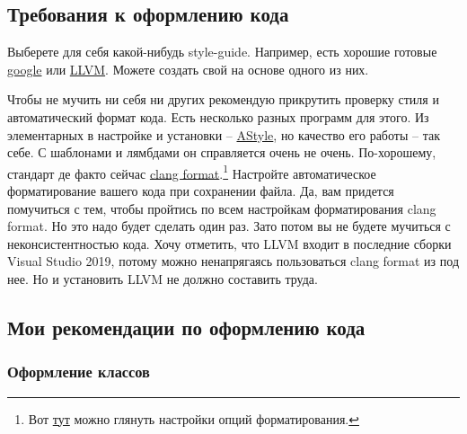 \documentclass{article}
\begin{document}
\subsection{Требования к оформлению кода}

Выберете для себя какой-нибудь style-guide. Например, есть хорошие готовые \href{https://google.github.io/styleguide/cppguide.html}{google} или \href{https://llvm.org/docs/CodingStandards.html}{LLVM}. Можете создать свой на основе одного из них.

Чтобы не мучить ни себя ни других рекомендую прикрутить проверку стиля и автоматический формат кода. Есть несколько разных программ для этого. Из элементарных в настройке и установки -- \href{http://astyle.sourceforge.net/}{AStyle}, но качество его работы -- так себе. С шаблонами и лямбдами он справляется очень не очень. По-хорошему, стандарт де факто сейчас \href{https://clang.llvm.org/docs/ClangFormat.html}{clang format}.\footnote{Вот \href{https://clang.llvm.org/docs/ClangFormatStyleOptions.html}{тут} можно глянуть настройки опций форматирования.} Настройте автоматическое форматирование вашего кода при сохранении файла. Да, вам придется помучиться с тем, чтобы пройтись по всем настройкам форматирования clang format. Но это надо будет сделать один раз. Зато потом вы не будете мучиться с неконсистентностью кода. Хочу отметить, что LLVM входит в последние сборки Visual Studio 2019, потому можно ненапрягаясь пользоваться clang format из под нее. Но и установить LLVM не должно составить труда.

\subsection{Мои рекомендации по оформлению кода}

\subsubsection{Оформление классов}
\end{document}
